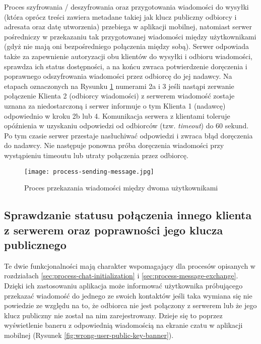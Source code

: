 \documentclass[../main.tex]{subfiles}
\begin{document}
Proces szyfrowania / deszyfrowania oraz przygotowania wiadomości do wysyłki (która oprócz treści zawiera metadane takiej jak klucz publiczny odbiorcy i adresata oraz datę utworzenia) przebiega w aplikacji mobilnej, natomiast serwer pośredniczy w przekazaniu tak przygotowanej wiadomości między użytkownikami (gdyż nie mają oni bezpośredniego połączenia między sobą). Serwer odpowiada także za zapewnienie autoryzacji obu klientów do wysyłki i odbioru wiadomości, sprawdza ich status dostępności, a na końcu zwraca potwierdzenie doręczenia i poprawnego odszyfrowania wiadomości przez odbiorcę do jej nadawcy. Na etapach oznaczonych na Rysunku \ref{fig:process-sending-message} numerami 2a i 3 jeśli nastąpi zerwanie połączenie Klienta 2 (odbiorcy wiadomości) z serwerem wiadomość zostaje uznana za niedostarczoną i serwer informuje o tym Klienta 1 (nadawcę) odpowiednio w kroku 2b lub 4. Komunikacja serwera z klientami toleruje opóźnienia w uzyskaniu odpowiedzi od odbiorców (tzw. \textit{timeout}) do 60 sekund. Po tym czasie serwer przestaje nasłuchiwać odpowiedzi i zwraca błąd doręczenia do nadawcy. Nie następuje ponowna próba doręczenia wiadomości przy wystąpieniu timeoutu lub utraty połączenia przez odbiorcę.

\begin{landscape}
	\begin{figure}[H]
		\centering
		\texttt{[image: process-sending-message.jpg]}
		\caption{Proces przekazania wiadomości między dwoma użytkownikami}
        \label{fig:process-sending-message}
	\end{figure}
\end{landscape}

\subsection{Sprawdzanie statusu połączenia innego klienta z serwerem oraz poprawności jego klucza publicznego}

Te dwie funkcjonalności mają charakter wspomagający dla procesów opisanych w rozdziałach \ref{sec:process-chat-initialization} i \ref{sec:process-message-exchange}. Dzięki ich zastosowaniu aplikacja może informować użytkownika próbującego przekazać wiadomość do jednego ze swoich kontaktów jeśli taka wymiana się nie powiedzie ze względu na to, że odbiorca nie jest połączony z serwerem lub że jego klucz publiczny nie został na nim zarejestrowany. Dzieje się to poprzez wyświetlenie baneru z odpowiednią wiadomością na ekranie czatu w aplikacji mobilnej (Rysunek \ref{fig:wrong-user-public-key-banner}).
\end{document}
